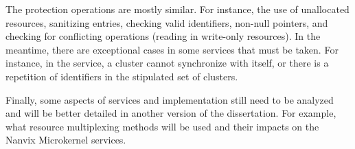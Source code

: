 			The protection operations are mostly similar.
			For instance, the use of unallocated resources, sanitizing entries,
			checking valid identifiers, non-null pointers, and checking
			for conflicting operations (reading in write-only resources).
			In the meantime, there are exceptional cases in some services
			that must be taken.
			For instance, in the \sync service, a cluster cannot synchronize
			with itself, or there is a repetition of identifiers in the
			stipulated set of clusters.

			Finally, some aspects of services and implementation still need
			to be analyzed and will be better detailed in another version
			of the dissertation.
			For example, what resource multiplexing methods will be used
			and their impacts on the Nanvix Microkernel services.